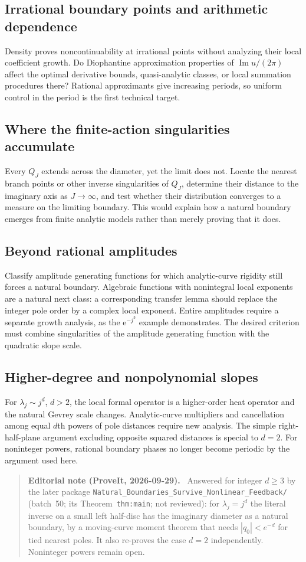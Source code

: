\documentclass[11pt,a4paper]{article}
\numberwithin{equation}{section}
\theoremstyle{definition}
\theoremstyle{remark}
\newcommand{\ee}{\mathrm e}
\newcommand{\Imm}{\operatorname{Im}}
\newenvironment{ednote}{\par\smallskip\begin{quote}\small\raggedright\textbf{Editorial note (ProveIt, 2026-09-29).}\ }{\end{quote}\smallskip}
\begin{document}
\subsection{Irrational boundary points and arithmetic dependence}
Density proves noncontinuability at irrational points without analyzing
their local coefficient growth.  Do Diophantine approximation properties
of $\Imm u/(2\pi)$ affect the optimal derivative bounds, quasi-analytic
classes, or local summation procedures there?  Rational approximants give
increasing periods, so uniform control in the period is the first
technical target.

\subsection{Where the finite-action singularities accumulate}
Every $Q_J$ extends across the diameter, yet the limit does not.
Locate the nearest branch points or other inverse singularities of
$Q_J$, determine their distance to the imaginary axis as $J\to\infty$,
and test whether their distribution converges to a measure on the
limiting boundary.  This would explain how a natural boundary emerges
from finite analytic models rather than merely proving that it does.

\subsection{Beyond rational amplitudes}
Classify amplitude generating functions for which analytic-curve
rigidity still forces a natural boundary.  Algebraic functions with
nonintegral local exponents are a natural next class: a corresponding
transfer lemma should replace the integer pole order by a complex local
exponent.  Entire amplitudes require a separate growth analysis, as the
$\ee^{-j^3}$ example demonstrates.  The desired criterion must combine
singularities of the amplitude generating function with the quadratic
slope scale.

\subsection{Higher-degree and nonpolynomial slopes}
For $\lambda_j\sim j^d$, $d>2$, the local formal operator is a
higher-order heat operator and the natural Gevrey scale changes.
Analytic-curve multipliers and cancellation among equal $d$th powers of
pole distances require new analysis.  The simple right-half-plane
argument excluding opposite squared distances is special to $d=2$.
For noninteger powers, rational boundary phases no longer become
periodic by the argument used here.
\begin{ednote}
Answered for integer $d\ge3$ by the later package
\nolinkurl{Natural_Boundaries_Survive_Nonlinear_Feedback/} (batch~50; its
Theorem~\texttt{thm:main}; not reviewed): for $\lambda_j=j^d$ the literal
inverse on a small left half-disc has the imaginary diameter as a natural
boundary, by a moving-curve moment theorem that needs $|q_0|<e^{-d}$ for
tied nearest poles. It also re-proves the case $d=2$ independently. Noninteger
powers remain open.
\end{ednote}
\end{document}
